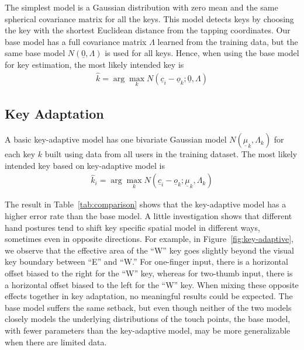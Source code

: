 \documentclass{sigchi}
\begin{document}
The simplest model is a Gaussian distribution with zero mean and the same spherical covariance matrix for all the keys. This model detects keys by choosing the key with the shortest Euclidean distance from the tapping coordinates. 
Our base model has a full covariance matrix $\Lambda$ learned from the
training data, but the same base model $N(\underline 0, \Lambda)$ is used for all keys. Hence, when using the base model for key estimation, the most likely intended key is
\begin{align}          
\hat k = \arg\max_k N(\underline c_i - \underline o_k; \underline 0, \Lambda)
\end{align}


\subsection{Key Adaptation}
A basic key-adaptive model has one bivariate Gaussian model
$N(\underline\mu_k, \Lambda_k)$ for each key $k$ built  using data from all users in the training dataset. The most likely intended key based on key-adaptive model is
\begin{align}          
\hat k_i = \arg\max_k N(\underline c_i - \underline o_k; \underline \mu_k, \Lambda_k)
\end{align}

The result in Table~\ref{tab:comparison} shows that the key-adaptive 
model has a higher error rate than the base model. A little investigation shows that different hand
postures tend to shift key specific spatial model in different ways, sometimes even in opposite
directions. For example, in Figure~\ref{fig:key-adaptive}, we observe that the
effective area of the ``W'' key goes slightly beyond the visual key boundary between ``E'' 
and ``W.'' For one-finger input, there is a horizontal offset biased to the
right for the ``W'' key, whereas for two-thumb input, there is a
horizontal offset biased to the left for the ``W'' key. When mixing these
opposite effects together in key adaptation, no meaningful results could be expected. The base model suffers the same setback, but even though neither
of the two models closely models the underlying distributions of the touch points, the base model, with fewer parameters than the key-adaptive model, may be more generalizable when there are limited data.
\end{document}
